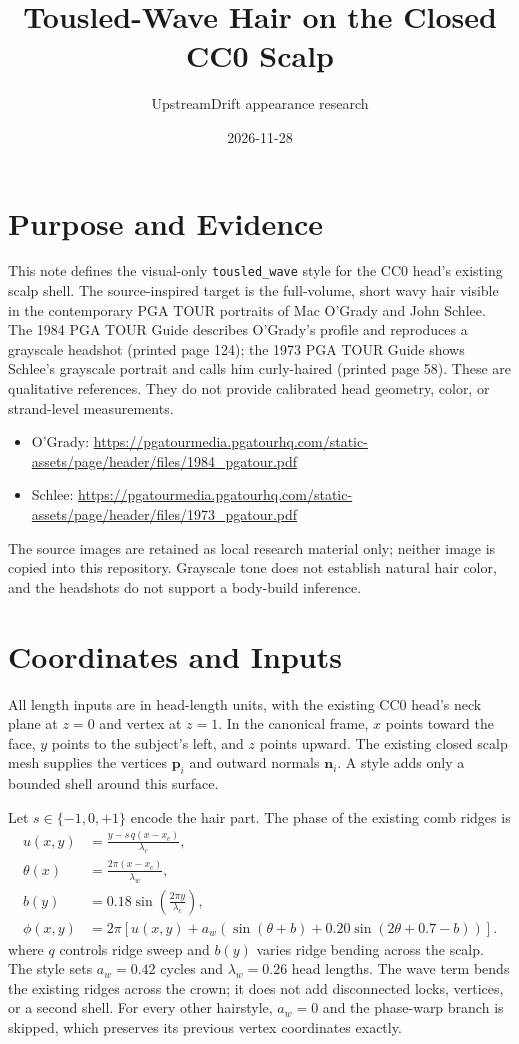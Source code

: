 \documentclass[11pt]{article}
\title{Tousled-Wave Hair on the Closed CC0 Scalp}
\author{UpstreamDrift appearance research}
\date{2026-11-28}
\begin{document}
\maketitle

\section{Purpose and Evidence}
This note defines the visual-only \texttt{tousled\_wave} style for the CC0
head's existing scalp shell. The source-inspired target is the full-volume,
short wavy hair visible in the contemporary PGA TOUR portraits of Mac O'Grady
and John Schlee. The 1984 PGA TOUR Guide describes O'Grady's profile and
reproduces a grayscale headshot (printed page 124); the 1973 PGA TOUR Guide
shows Schlee's grayscale portrait and calls him curly-haired (printed page
58). These are qualitative references. They do not provide calibrated head
geometry, color, or strand-level measurements.

\begin{itemize}
  \item O'Grady: \url{https://pgatourmedia.pgatourhq.com/static-assets/page/header/files/1984_pgatour.pdf}
  \item Schlee: \url{https://pgatourmedia.pgatourhq.com/static-assets/page/header/files/1973_pgatour.pdf}
\end{itemize}
The source images are retained as local research material only; neither image
is copied into this repository. Grayscale tone does not establish natural hair
color, and the headshots do not support a body-build inference.

\section{Coordinates and Inputs}
All length inputs are in head-length units, with the existing CC0 head's neck
plane at $z=0$ and vertex at $z=1$. In the canonical frame, $x$ points toward
the face, $y$ points to the subject's left, and $z$ points upward. The existing
closed scalp mesh supplies the vertices $\mathbf{p}_i$ and outward normals
$\mathbf{n}_i$. A style adds only a bounded shell around this surface.

Let $s\in\{-1,0,+1\}$ encode the hair part. The phase of the existing comb
ridges is
\begin{align}
 u(x,y) &= \frac{y-s\,q(x-x_c)}{\lambda_c},\\
 \theta(x) &= \frac{2\pi(x-x_c)}{\lambda_w},\\
 b(y) &= 0.18\sin\left(\frac{2\pi y}{\lambda_c}\right),\\
 \phi(x,y) &= 2\pi\left[u(x,y)+a_w\left(\sin(\theta+b)+0.20\sin(2\theta+0.7-b)\right)\right].
\end{align}
where $q$ controls ridge sweep and $b(y)$ varies ridge bending across the scalp. The style sets $a_w=0.42$ cycles and
$\lambda_w=0.26$ head lengths. The wave term bends the existing ridges across
the crown; it does not add disconnected locks, vertices, or a second shell.
For every other hairstyle, $a_w=0$ and the phase-warp branch is skipped, which
preserves its previous vertex coordinates exactly.
\end{document}
